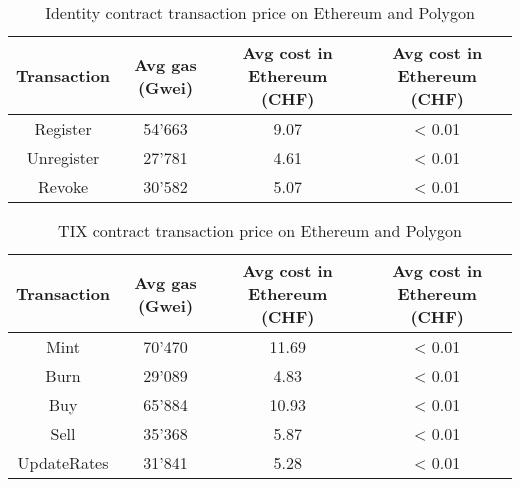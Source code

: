 \documentclass[a4paper,11pt,oneside]{report}
\begin{document}
\begin{table}[h!]
\begin{center}
\begin{NiceTabular}{ |c||c|c|c| }
 \hline
 Transaction & Avg gas (Gwei) & Avg cost in Ethereum (CHF) & Avg cost in Ethereum (CHF) \\
 \hline \hline
 Register & 54'663 & 9.07 & < 0.01 \\
 Unregister & 27'781 & 4.61 & < 0.01 \\
 Revoke & 30'582 & 5.07 & < 0.01 \\
 \hline
\end{NiceTabular}
\caption{Identity contract transaction price on Ethereum and Polygon}
\label{table:identity_contract_transaction_cost}
\end{center}
\end{table}

\begin{table}[h!]
\begin{center}
\begin{NiceTabular}{ |c||c|c|c| }
 \hline
 Transaction & Avg gas (Gwei) & Avg cost in Ethereum (CHF) & Avg cost in Ethereum (CHF) \\
 \hline \hline
 Mint & 70'470 & 11.69 & < 0.01 \\
 Burn & 29'089 & 4.83 & < 0.01 \\
 Buy & 65'884 & 10.93 & < 0.01 \\
 Sell & 35'368 & 5.87 & < 0.01 \\
 UpdateRates & 31'841 & 5.28 & < 0.01 \\
 \hline
\end{NiceTabular}
\caption{TIX contract transaction price on Ethereum and Polygon}
\label{table:tix_contract_transaction_cost}
\end{center}
\end{table}
\end{document}
